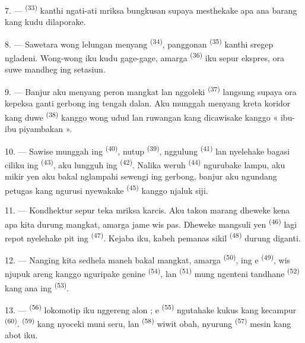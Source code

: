 7. ---  \textsuperscript{(33)} kanthi
ngati-ati mriksa bungkusan supaya mesthekake apa ana barang kang kudu
dilaporake.

8. --- Sawetara wong lelungan menyang 
\textsuperscript{(34)}, panggonan  \textsuperscript{(35)}
kanthi sregep ngladeni. Wong-wong iku kudu gage-gage, amarga
 \textsuperscript{(36)} iku sepur ekspres, ora suwe mandheg
ing setasiun.

9. --- Banjur aku menyang peron mangkat lan nggoleki 
\textsuperscript{(37)} langsung supaya ora kepeksa ganti gerbong ing
tengah dalan. Aku munggah menyang kreta koridor kang duwe
 \textsuperscript{(38)} kanggo wong udud lan ruwangan
kang dicawisake kanggo « ibu-ibu piyambakan ».

\VUsaut{3.0mm}
\VUsaut{3.0mm}

10. --- Sawise munggah ing  \textsuperscript{(40)},
nutup  \textsuperscript{(39)}, nggulung 
\textsuperscript{(41)} lan nyelehake bagasi ciliku ing  \textsuperscript{(43)}, aku lungguh ing 
\textsuperscript{(42)}. Nalika weruh 
\textsuperscript{(44)} ngurubake lampu, aku mikir yen aku bakal
nglampahi sewengi ing gerbong, banjur aku ngundang petugas kang ngurusi
nyewakake  \textsuperscript{(45)} kanggo njaluk siji.

11. --- Kondhektur sepur teka mriksa karcis. Aku takon marang dheweke
kena apa kita durung mangkat, amarga jame wis pas. Dheweke mangsuli yen
 \textsuperscript{(46)} lagi repot nyelehake pit ing
 \textsuperscript{(47)}. Kejaba iku, kabeh
pemanas sikil \textsuperscript{(48)} durung diganti.

12. --- Nanging kita sedhela maneh bakal mangkat, amarga  \textsuperscript{(50)}, ing e \textsuperscript{(49)},
wis njupuk areng kanggo nguripake genine 
\textsuperscript{(54)}, lan  \textsuperscript{(51)} mung
ngenteni tandhane  \textsuperscript{(52)}
kang ana ing  \textsuperscript{(53)}.

13. ---  \textsuperscript{(56)} lokomotip iku nggereng
alon ; e \textsuperscript{(55)} ngutahake kukus kang
kecampur  \textsuperscript{(60)}. 
\textsuperscript{(59)} kang nyoceki muni seru, lan 
\textsuperscript{(58)} wiwit obah, nyurung 
\textsuperscript{(57)} mesin kang abot iku.

